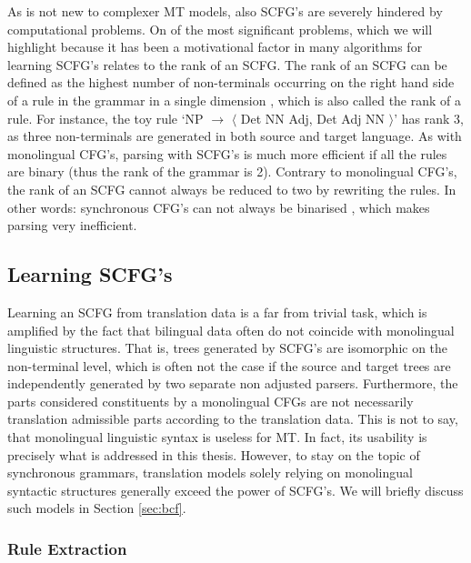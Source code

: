 As is not new to complexer MT models, also SCFG's are severely hindered by computational problems. On of the most significant problems, which we will highlight because it has been a motivational factor in many algorithms for learning SCFG's \citep[e.g.,]{zhang2006synchronous,zhang2008extracting,huang2009binarization} relates to the rank of an SCFG. The rank of an SCFG can be defined as the highest number of non-terminals occurring on the right hand side of a rule in the grammar in a single dimension \citep{gildea2006factoring}, which is also called the rank of a rule. For instance, the toy rule `NP $\rightarrow$ $\langle$ Det NN Adj, Det Adj NN $\rangle$' has rank 3, as three non-terminals are generated in both source and target language. As with monolingual CFG's, parsing with SCFG's is much more efficient if all the rules are binary (thus the rank of the grammar is 2). Contrary to monolingual CFG's, the rank of an SCFG cannot always be reduced to two by rewriting the rules. In other words: synchronous CFG's can not always be binarised \citep{huang2009binarization}, which makes parsing very inefficient.


\subsection{Learning SCFG's}
\label{subsec:learningSCFGs}

Learning an SCFG from translation data is a far from trivial task, which is amplified by the fact that bilingual data often do not coincide with monolingual linguistic structures. That is, trees generated by SCFG's are isomorphic on the non-terminal level, which is often not the case if the source and target trees are independently generated by two separate non adjusted parsers. Furthermore, the parts considered constituents by a monolingual CFGs are not necessarily translation admissible parts according to the translation data. This is not to say, that monolingual linguistic syntax is useless for MT. In fact, its usability is precisely what is addressed in this thesis. However, to stay on the topic of synchronous grammars, translation models solely relying on monolingual syntactic structures generally exceed the power of SCFG's. We will briefly discuss such models in Section \ref{sec:bcf}.

\subsubsection{Rule Extraction}

